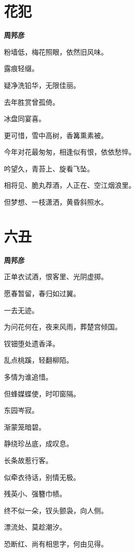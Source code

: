 \documentclass[12pt,a4paper]{ctexbook}
\begin{document}
\section{花犯}
\textbf{周邦彦}\par\vspace{0.5em}
粉墙低，梅花照眼，依然旧风味。\par
露痕轻缀。\par
疑净洗铅华，无限佳丽。\par
去年胜赏曾孤倚。\par
冰盘同宴喜。\par
更可惜，雪中高树，香篝熏素被。\par
今年对花最匆匆，相逢似有恨，依依愁悴。\par
吟望久，青苔上、旋看飞坠。\par
相将见、脆丸荐酒，人正在、空江烟浪里。\par
但梦想、一枝潇洒，黄昏斜照水。\par

\section{六丑}
\textbf{周邦彦}\par\vspace{0.5em}
正单衣试酒，恨客里、光阴虚掷。\par
愿春暂留，春归如过翼。\par
一去无迹。\par
为问花何在，夜来风雨，葬楚宫倾国。\par
钗钿堕处遗香泽。\par
乱点桃蹊，轻翻柳陌。\par
多情为谁追惜。\par
但蜂媒蝶使，时叩窗隔。\par
东园岑寂。\par
渐蒙笼暗碧。\par
静绕珍丛底，成叹息。\par
长条故惹行客。\par
似牵衣待话，别情无极。\par
残英小、强簪巾帻。\par
终不似一朵，钗头颤袅，向人侧。\par
漂流处、莫趁潮汐。\par
恐断红、尚有相思字，何由见得。\par
\end{document}

